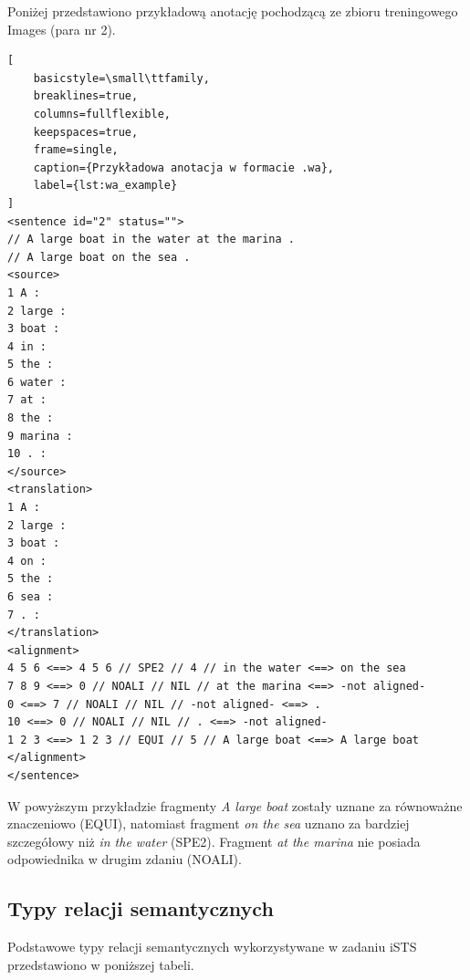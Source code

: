 \documentclass[a4paper,10pt]{article}
\begin{document}
Poniżej przedstawiono przykładową anotację pochodzącą
ze zbioru treningowego Images (para nr 2).

\begin{lstlisting}[
    basicstyle=\small\ttfamily,
    breaklines=true,
    columns=fullflexible,
    keepspaces=true,
    frame=single,
    caption={Przykładowa anotacja w formacie .wa},
    label={lst:wa_example}
]
<sentence id="2" status="">
// A large boat in the water at the marina .
// A large boat on the sea .
<source>
1 A :
2 large :
3 boat :
4 in :
5 the :
6 water :
7 at :
8 the :
9 marina :
10 . :
</source>
<translation>
1 A :
2 large :
3 boat :
4 on :
5 the :
6 sea :
7 . :
</translation>
<alignment>
4 5 6 <==> 4 5 6 // SPE2 // 4 // in the water <==> on the sea
7 8 9 <==> 0 // NOALI // NIL // at the marina <==> -not aligned-
0 <==> 7 // NOALI // NIL // -not aligned- <==> .
10 <==> 0 // NOALI // NIL // . <==> -not aligned-
1 2 3 <==> 1 2 3 // EQUI // 5 // A large boat <==> A large boat
</alignment>
</sentence>
\end{lstlisting}

W powyższym przykładzie fragmenty \textit{A large boat}
zostały uznane za równoważne znaczeniowo (EQUI),
natomiast fragment \textit{on the sea} uznano za
bardziej szczegółowy niż \textit{in the water} (SPE2).
Fragment \textit{at the marina} nie posiada odpowiednika
w drugim zdaniu (NOALI).

\subsection{Typy relacji semantycznych}

Podstawowe typy relacji semantycznych wykorzystywane
w zadaniu iSTS przedstawiono w poniższej tabeli.
\end{document}

